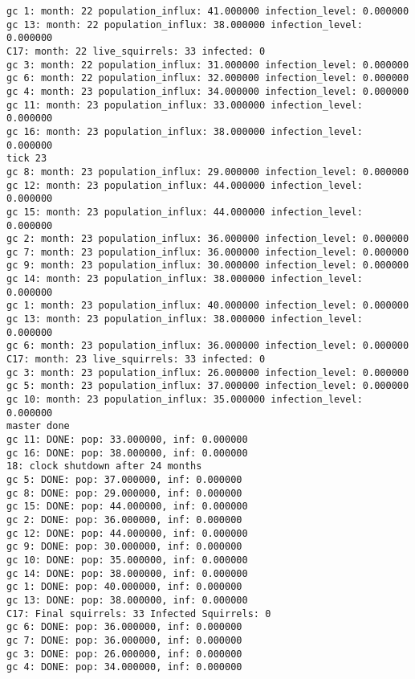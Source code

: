\begin{lstlisting}[basicstyle=\tiny]
gc 1: month: 22 population_influx: 41.000000 infection_level: 0.000000
gc 13: month: 22 population_influx: 38.000000 infection_level: 0.000000
C17: month: 22 live_squirrels: 33 infected: 0
gc 3: month: 22 population_influx: 31.000000 infection_level: 0.000000
gc 6: month: 22 population_influx: 32.000000 infection_level: 0.000000
gc 4: month: 23 population_influx: 34.000000 infection_level: 0.000000
gc 11: month: 23 population_influx: 33.000000 infection_level: 0.000000
gc 16: month: 23 population_influx: 38.000000 infection_level: 0.000000
tick 23
gc 8: month: 23 population_influx: 29.000000 infection_level: 0.000000
gc 12: month: 23 population_influx: 44.000000 infection_level: 0.000000
gc 15: month: 23 population_influx: 44.000000 infection_level: 0.000000
gc 2: month: 23 population_influx: 36.000000 infection_level: 0.000000
gc 7: month: 23 population_influx: 36.000000 infection_level: 0.000000
gc 9: month: 23 population_influx: 30.000000 infection_level: 0.000000
gc 14: month: 23 population_influx: 38.000000 infection_level: 0.000000
gc 1: month: 23 population_influx: 40.000000 infection_level: 0.000000
gc 13: month: 23 population_influx: 38.000000 infection_level: 0.000000
gc 6: month: 23 population_influx: 36.000000 infection_level: 0.000000
C17: month: 23 live_squirrels: 33 infected: 0
gc 3: month: 23 population_influx: 26.000000 infection_level: 0.000000
gc 5: month: 23 population_influx: 37.000000 infection_level: 0.000000
gc 10: month: 23 population_influx: 35.000000 infection_level: 0.000000
master done
gc 11: DONE: pop: 33.000000, inf: 0.000000
gc 16: DONE: pop: 38.000000, inf: 0.000000
18: clock shutdown after 24 months
gc 5: DONE: pop: 37.000000, inf: 0.000000
gc 8: DONE: pop: 29.000000, inf: 0.000000
gc 15: DONE: pop: 44.000000, inf: 0.000000
gc 2: DONE: pop: 36.000000, inf: 0.000000
gc 12: DONE: pop: 44.000000, inf: 0.000000
gc 9: DONE: pop: 30.000000, inf: 0.000000
gc 10: DONE: pop: 35.000000, inf: 0.000000
gc 14: DONE: pop: 38.000000, inf: 0.000000
gc 1: DONE: pop: 40.000000, inf: 0.000000
gc 13: DONE: pop: 38.000000, inf: 0.000000
C17: Final squirrels: 33 Infected Squirrels: 0
gc 6: DONE: pop: 36.000000, inf: 0.000000
gc 7: DONE: pop: 36.000000, inf: 0.000000
gc 3: DONE: pop: 26.000000, inf: 0.000000
gc 4: DONE: pop: 34.000000, inf: 0.000000
\end{lstlisting}
